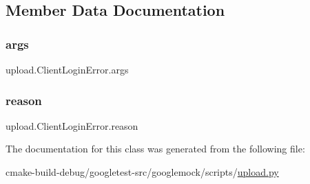 \subsection{Member Data Documentation}
\mbox{\label{classupload_1_1ClientLoginError_ac300a0b034b2bc64cedc51e09fb6d663}} 
\subsubsection{\texorpdfstring{args}{args}}
{\footnotesize\ttfamily upload.\+Client\+Login\+Error.\+args}

\mbox{\label{classupload_1_1ClientLoginError_ae0555feb182d89d1e4d7944afbfe14e5}} 
\subsubsection{\texorpdfstring{reason}{reason}}
{\footnotesize\ttfamily upload.\+Client\+Login\+Error.\+reason}



The documentation for this class was generated from the following file\+:\begin{DoxyCompactItemize}
\item 
cmake-\/build-\/debug/googletest-\/src/googlemock/scripts/\mbox{\hyperlink{googlemock_2scripts_2upload_8py}{upload.\+py}}\end{DoxyCompactItemize}
